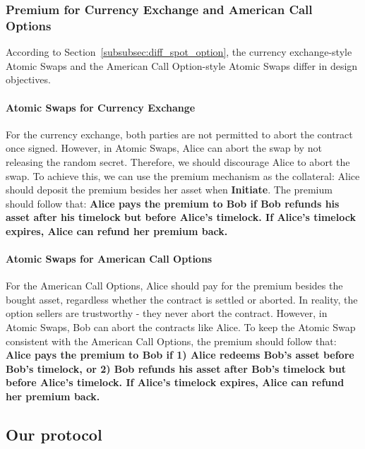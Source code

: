 \subsubsection{Premium for Currency Exchange and American Call Options}
\label{subsubsec:design_obj}

According to Section~\ref{subsubsec:diff_spot_option}, the currency exchange-style Atomic Swaps and the American Call Option-style Atomic Swaps differ in design objectives.

\paragraph{Atomic Swaps for Currency Exchange}
For the currency exchange, both parties are not permitted to abort the contract once signed.
However, in Atomic Swaps, Alice can abort the swap by not releasing the random secret.
Therefore, we should discourage Alice to abort the swap.
To achieve this, we can use the premium mechanism as the collateral: Alice should deposit the premium besides her asset when \textbf{Initiate}.
The premium should follow that:
\textbf{Alice pays the premium to Bob if Bob refunds his asset after his timelock but before Alice's timelock.
If Alice's timelock expires, Alice can refund her premium back.}

\paragraph{Atomic Swaps for American Call Options}
For the American Call Options, Alice should pay for the premium besides the bought asset, regardless whether the contract is settled or aborted.
In reality, the option sellers are trustworthy - they never abort the contract.
However, in Atomic Swaps, Bob can abort the contracts like Alice.
To keep the Atomic Swap consistent with the American Call Options,
the premium should follow that: 
\textbf{Alice pays the premium to Bob if
1) Alice redeems Bob's asset before Bob's timelock, or
2) Bob refunds his asset after Bob's timelock but before Alice's timelock.
If Alice's timelock expires, Alice can refund her premium back.}











\subsection{Our protocol}



